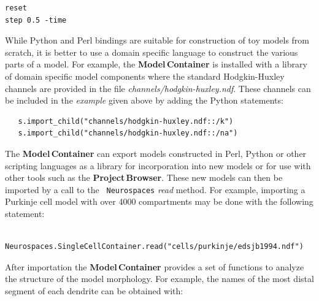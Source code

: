 \documentclass[12pt]{article}
\begin{document}
{\begin{minipage}{1\linewidth}
\begin{minipage}[t]{.50\linewidth}
\begin{verbatim}
reset
step 0.5 -time
\end{verbatim}
    \end{minipage}
  \end{minipage}
  \linenumbers
  \vspace*{1mm}
}

While Python and Perl bindings are suitable for construction of toy
models from scratch, it is better to use a domain specific language to
construct the various parts of a model. For example, the {\bf
  Model\,Container} is installed with a library of domain specific
model components where the standard Hodgkin-Huxley channels are
provided in the file {\it channels/hodgkin-huxley.ndf}.  These
channels can be included in the {\it example} given above by adding
the Python statements:

{\footnotesize
\begin{verbatim}
   s.import_child("channels/hodgkin-huxley.ndf::/k")
   s.import_child("channels/hodgkin-huxley.ndf::/na")
\end{verbatim}
}

The {\bf Model\,Container} can export models constructed in Perl, Python or other
scripting languages as a library for incorporation into new models or
for use with other tools such as the {\bf Project\,Browser}.
These new models can then be imported by a call to the {\tt
  Neurospaces} {\it read} method. For example, importing a Purkinje
cell model with over 4000 compartments may be done with the following
statement:

{\footnotesize
\begin{verbatim}
   Neurospaces.SingleCellContainer.read("cells/purkinje/edsjb1994.ndf")
\end{verbatim}
}

After importation the {\bf Model\,Container} provides a set of
functions to analyze the structure of the model morphology.  For
example, the names of the most distal segment of each dendrite can be
obtained with:
\end{document}

